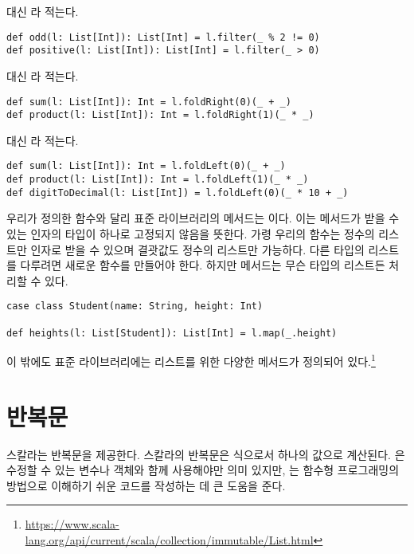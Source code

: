  대신 라 적는다.

\begin{verbatim}
def odd(l: List[Int]): List[Int] = l.filter(_ % 2 != 0)
def positive(l: List[Int]): List[Int] = l.filter(_ > 0)
\end{verbatim}

 대신 라 적는다.

\begin{verbatim}
def sum(l: List[Int]): Int = l.foldRight(0)(_ + _)
def product(l: List[Int]): Int = l.foldRight(1)(_ * _)
\end{verbatim}

 대신 라 적는다.

\begin{verbatim}
def sum(l: List[Int]): Int = l.foldLeft(0)(_ + _)
def product(l: List[Int]): Int = l.foldLeft(1)(_ * _)
def digitToDecimal(l: List[Int]) = l.foldLeft(0)(_ * 10 + _)
\end{verbatim}

우리가 정의한 함수와 달리 표준 라이브러리의 메서드는
이다. 이는 메서드가 받을 수 있는 인자의 타입이 하나로
고정되지 않음을 뜻한다. 가령 우리의  함수는 정수의 리스트만 인자로
받을 수 있으며 결괏값도 정수의 리스트만 가능하다. 다른 타입의 리스트를 다루려면
새로운  함수를 만들어야 한다. 하지만  메서드는 무슨 타입의
리스트든 처리할 수 있다.

\begin{verbatim}
case class Student(name: String, height: Int)

def heights(l: List[Student]): List[Int] = l.map(_.height)
\end{verbatim}

이 밖에도 표준 라이브러리에는 리스트를 위한 다양한 메서드가 정의되어
있다.\footnote{\url{https://www.scala-lang.org/api/current/scala/collection/immutable/List.html}}

\section{ 반복문}

스칼라는  반복문을 제공한다. 스칼라의  반복문은 식으로서
하나의 값으로 계산된다. 은 수정할 수 있는 변수나 객체와 함께
사용해야만 의미 있지만, 는 함수형 프로그래밍의 방법으로 이해하기 쉬운
코드를 작성하는 데 큰 도움을 준다.

